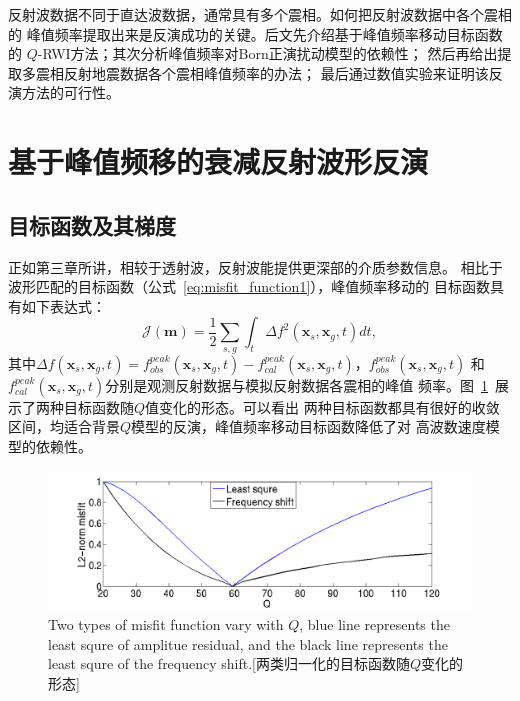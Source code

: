反射波数据不同于直达波数据，通常具有多个震相。如何把反射波数据中各个震相的
峰值频率提取出来是反演成功的关键。后文先介绍基于峰值频率移动目标函数的
$Q$-RWI方法；其次分析峰值频率对Born正演扰动模型的依赖性；
然后再给出提取多震相反射地震数据各个震相峰值频率的办法；
最后通过数值实验来证明该反演方法的可行性。


\newpage
\section{基于峰值频移的衰减反射波形反演}
\subsection{目标函数及其梯度}
正如第三章所讲，相较于透射波，反射波能提供更深部的介质参数信息。
相比于波形匹配的目标函数（公式~\ref{eq:misfit_function1}），峰值频率移动的
目标函数具有如下表达式：
\begin{equation}
    \mathcal{J}(\mathbf{m})=\frac{1}{2}\sum_{s,g}\int_t\Delta f^2(\mathbf{x}_s,\mathbf{x}_g,t)dt,
    \label{eq:freq_misfit_function}
\end{equation}
其中$\Delta f(\mathbf{x}_s,\mathbf{x}_g,t)=f^{peak}_{obs}(\mathbf{x}_s,\mathbf{x}_g,t)-
f^{peak}_{cal}(\mathbf{x}_s,\mathbf{x}_g,t)$，$f^{peak}_{obs}(\mathbf{x}_s,\mathbf{x}_g,t)$
和$f^{peak}_{cal}(\mathbf{x}_s,\mathbf{x}_g,t)$分别是观测反射数据与模拟反射数据各震相的峰值
频率。图~\ref{fig:misfit_com}~展示了两种目标函数随$Q$值变化的形态。可以看出
两种目标函数都具有很好的收敛区间，均适合背景$Q$模型的反演，峰值频率移动目标函数降低了对
高波数速度模型的依赖性。
\begin{figure}[!htbp]
    \centering
    {\includegraphics[width=0.98\linewidth]{figure/misfit_com}}
	{Two types of misfit function vary with $Q$, blue line represents the least 
	squre of amplitue residual, and the black line represents the least squre of 
	the frequency shift.}[两类归一化的目标函数随$Q$变化的形态]
    \label{fig:misfit_com}
\end{figure}

